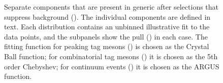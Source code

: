 \begin{figure}[htbp!]
    \centering
    \caption{\label{fig:tag_component_fits} Separate components that are present in generic \MC after selections that suppress background ().
    The individual components are defined in  text.
    Each distribution contains an unbinned illustrative fit to the data points, and the subpanels show the pull () in each case.
    The fitting function for peaking tag \B mesons () is chosen as the Crystal Ball function;
    for combinatorial tag \B mesons () it is chosen as the 5th order Chebyshev;
    for continuum \epem\ra\qqbar events () it is chosen as the ARGUS function.
    }
\end{figure}

